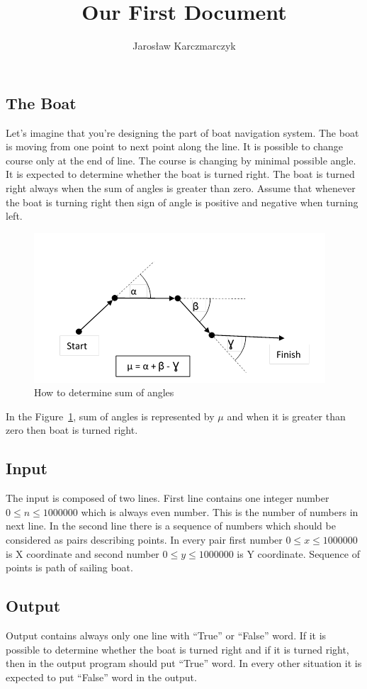 \documentclass{article}
\title{Our First Document}
\author{Jarosław Karczmarczyk}
\date{}
\begin{document}
\pagestyle{empty}
\begin{center} \section*{The Boat} \end{center}


\noindent Let’s imagine that you’re designing the part of boat navigation system. The boat is moving from one point to next point along the line. It is possible to change course only at the end of line. The course is changing by minimal possible angle. It is expected to determine whether the boat is turned right. The boat is turned right always when the sum of angles is greater than zero. Assume that whenever the boat is turning right then sign of angle is positive and negative when turning left.
\begin{figure}[htpb]
\begin{center}
\includegraphics{boat_path.png}
\caption{How to determine sum of angles}
\label{boat_path}
\end{center}
\end{figure}


\noindent In the Figure~\ref{boat_path}, sum of angles is represented by \(\mu\) and when it is greater than zero then boat is turned right. 

\subsection*{Input}
The input is composed of two lines. First line contains one integer number \(0 \leq n \leq 1000000\) which is always even number. This is the number of numbers in next line. 
In the second line there is a sequence of numbers which should be considered as pairs describing points. In every pair first number \(0 \leq x \leq 1 000 000\) is X coordinate and second number \(0 \leq y \leq 1 000 000\) is Y coordinate. Sequence of points is path of sailing boat. 

\subsection*{Output}
Output contains always only one line with “True” or “False” word. 
If it is possible to determine whether the boat is turned right and if it is turned right, then in the output program should put “True” word. In every other situation it is expected to put “False” word in the output.
\end{document}

